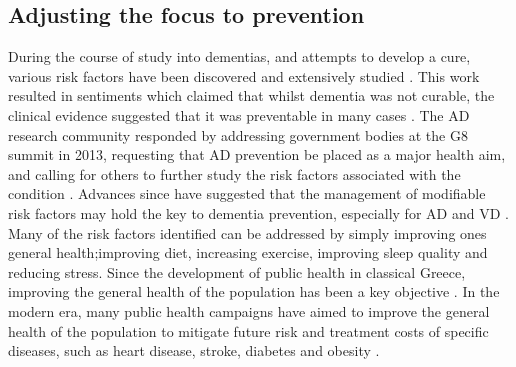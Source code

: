 \subsection{Adjusting the focus to prevention}
During the course of study into dementias, and attempts to develop a cure, various risk factors have been discovered and extensively studied \cite{Baumgart2015}. This work resulted in sentiments which claimed that whilst dementia was not curable, the clinical evidence suggested that it was preventable in many cases \cite{DelaTorre2010,Willis2013}. The AD research community responded by addressing government bodies at the G8 summit in 2013, requesting that AD prevention be placed as a major health aim, and calling for others to further study the risk factors associated with the condition \cite{Smith2014}. Advances since have suggested that the management of modifiable risk factors may hold the key to dementia prevention, especially for AD and VD \cite{Solomon2014, Lovden2013}. Many of the risk factors identified can be addressed by simply improving ones general health;improving diet, increasing exercise, improving sleep quality and reducing stress. Since the development of public health in classical Greece, improving the general health of the population has been a key objective \cite{Ozonoff1994}. In the modern era, many public health campaigns have aimed to improve the general health of the population to mitigate future risk and treatment costs of specific diseases, such as heart disease, stroke, diabetes and obesity \cite{Labarthe2014, CentersforDiseaseControlandPrevention2015}.

